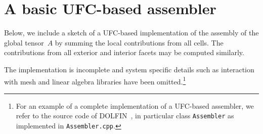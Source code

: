 \chapter{A basic UFC-based assembler}
\label{app:assembly}

Below, we include a sketch of a UFC-based implementation of the assembly
of the global tensor~$A$ by summing the local contributions from all
cells. The contributions from all exterior and interior facets may be
computed similarly.

The implementation is incomplete and system specific details such as
interaction with mesh and linear algebra libraries have been
omitted.\footnote{For an example of a complete implementation of a
UFC-based assembler, we refer to the source code of
DOLFIN~\cite{www:dolfin}, in particular class \texttt{Assembler} as
implemented in \texttt{Assembler.cpp}.}

